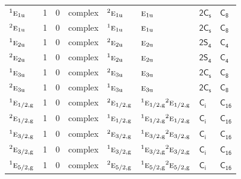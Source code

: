 \documentclass[10pt,a4paper]{article}
\makeatletter
\def\grouprule#1#2{\noalign{\marks\LTgroupmarks{\the\belowrulesep}\nobreak\vskip#1%
  \vskip\aboverulesep}\multispan\LT@cols\unskip{\leaders\hrule\@height#2\hfill\kern\z@}\cr
  \noalign{\penalty\LTrulebreak\vskip\belowrulesep\global\@lastruleclass\z@}}
\numberwithin{equation}{section}
\newcommand{\grp}[1]{\mathsf{#1}}
\newcommand{\irr}[1]{\text{\normalfont\scshape #1}}
\newcommand{\conjpair}[1]{{}^{#1}}
\newcommand{\ptag}[1]{\mathrm{#1}}
\makeatother
\begin{document}
{\begin{longtable}{@{}lrrlllll@{}}
$\conjpair{1}\irr{e}_{1\ptag{u}}$ & 1 & $0$ & complex & $\conjpair{2}\irr{e}_{1\ptag{u}}$ & $\irr{e}_{1\ptag{u}}$ & \href{2C1v.pdf}{$\grp{2C_{s}}$} & \href{../../../rotation/data/pdf/C8.pdf}{$\grp{C_{8}}$}\\
$\conjpair{2}\irr{e}_{1\ptag{u}}$ & 1 & $0$ & complex & $\conjpair{1}\irr{e}_{1\ptag{u}}$ & $\irr{e}_{1\ptag{u}}$ & \href{2C1v.pdf}{$\grp{2C_{s}}$} & \href{../../../rotation/data/pdf/C8.pdf}{$\grp{C_{8}}$}\\
$\conjpair{1}\irr{e}_{2\ptag{u}}$ & 1 & $0$ & complex & $\conjpair{2}\irr{e}_{2\ptag{u}}$ & $\irr{e}_{2\ptag{u}}$ & \href{2S4.pdf}{$\grp{2S_{4}}$} & \href{../../../rotation/data/pdf/C4.pdf}{$\grp{C_{4}}$}\\
$\conjpair{2}\irr{e}_{2\ptag{u}}$ & 1 & $0$ & complex & $\conjpair{1}\irr{e}_{2\ptag{u}}$ & $\irr{e}_{2\ptag{u}}$ & \href{2S4.pdf}{$\grp{2S_{4}}$} & \href{../../../rotation/data/pdf/C4.pdf}{$\grp{C_{4}}$}\\
$\conjpair{1}\irr{e}_{3\ptag{u}}$ & 1 & $0$ & complex & $\conjpair{2}\irr{e}_{3\ptag{u}}$ & $\irr{e}_{3\ptag{u}}$ & \href{2C1v.pdf}{$\grp{2C_{s}}$} & \href{../../../rotation/data/pdf/C8.pdf}{$\grp{C_{8}}$}\\
$\conjpair{2}\irr{e}_{3\ptag{u}}$ & 1 & $0$ & complex & $\conjpair{1}\irr{e}_{3\ptag{u}}$ & $\irr{e}_{3\ptag{u}}$ & \href{2C1v.pdf}{$\grp{2C_{s}}$} & \href{../../../rotation/data/pdf/C8.pdf}{$\grp{C_{8}}$}\\
\grouprule{0pt}{\lightrulewidth}
$\conjpair{1}\irr{e}_{1/2,\ptag{g}}$ & 1 & $0$ & complex & $\conjpair{2}\irr{e}_{1/2,\ptag{g}}$ & $\conjpair{1}\irr{e}_{1/2,\ptag{g}}\conjpair{2}\irr{e}_{1/2,\ptag{g}}$ & \href{S2.pdf}{$\grp{C_{i}}$} & $\grp{C_{16}}$\\
$\conjpair{2}\irr{e}_{1/2,\ptag{g}}$ & 1 & $0$ & complex & $\conjpair{1}\irr{e}_{1/2,\ptag{g}}$ & $\conjpair{1}\irr{e}_{1/2,\ptag{g}}\conjpair{2}\irr{e}_{1/2,\ptag{g}}$ & \href{S2.pdf}{$\grp{C_{i}}$} & $\grp{C_{16}}$\\
$\conjpair{1}\irr{e}_{3/2,\ptag{g}}$ & 1 & $0$ & complex & $\conjpair{2}\irr{e}_{3/2,\ptag{g}}$ & $\conjpair{1}\irr{e}_{3/2,\ptag{g}}\conjpair{2}\irr{e}_{3/2,\ptag{g}}$ & \href{S2.pdf}{$\grp{C_{i}}$} & $\grp{C_{16}}$\\
$\conjpair{2}\irr{e}_{3/2,\ptag{g}}$ & 1 & $0$ & complex & $\conjpair{1}\irr{e}_{3/2,\ptag{g}}$ & $\conjpair{1}\irr{e}_{3/2,\ptag{g}}\conjpair{2}\irr{e}_{3/2,\ptag{g}}$ & \href{S2.pdf}{$\grp{C_{i}}$} & $\grp{C_{16}}$\\
$\conjpair{1}\irr{e}_{5/2,\ptag{g}}$ & 1 & $0$ & complex & $\conjpair{2}\irr{e}_{5/2,\ptag{g}}$ & $\conjpair{1}\irr{e}_{5/2,\ptag{g}}\conjpair{2}\irr{e}_{5/2,\ptag{g}}$ & \href{S2.pdf}{$\grp{C_{i}}$} & $\grp{C_{16}}$\\

\end{longtable}}
\end{document}
